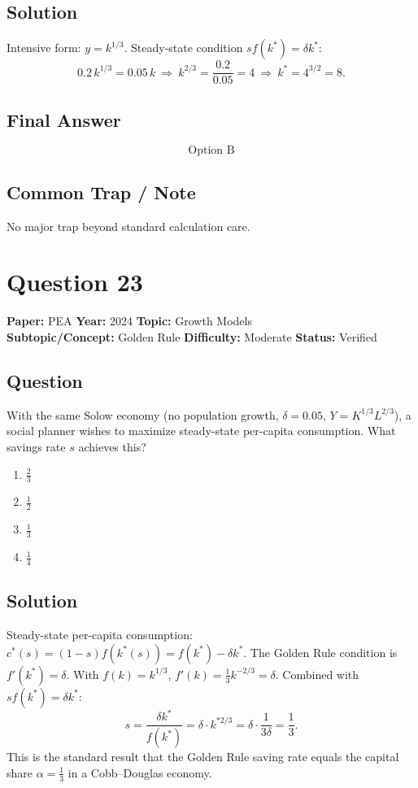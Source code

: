 \documentclass[11pt]{article}
\begin{document}
\subsection*{Solution}
Intensive form: $y=k^{1/3}$. Steady-state condition $sf(k^{*})=\delta k^{*}$:
\[
0.2\,k^{1/3}=0.05\,k\ \Longrightarrow\ k^{2/3}=\frac{0.2}{0.05}=4\ \Longrightarrow\ k^{*}=4^{3/2}=8.
\]

\subsection*{Final Answer}
\[
\boxed{\text{Option B}}
\]

\subsection*{Common Trap / Note}
No major trap beyond standard calculation care.

\section*{Question 23}
\textbf{Paper:} PEA \quad \textbf{Year:} 2024 \quad \textbf{Topic:} Growth Models \\
\textbf{Subtopic/Concept:} Golden Rule \quad \textbf{Difficulty:} Moderate \quad \textbf{Status:} Verified

\subsection*{Question}
With the same Solow economy (no population growth, $\delta=0.05$, $Y=K^{1/3}L^{2/3}$), a social planner wishes to maximize steady-state per-capita consumption. What savings rate $s$ achieves this?
\begin{enumerate}[label=(\Alph*)]
\item $\tfrac{2}{3}$
\item $\tfrac{1}{2}$
\item $\tfrac{1}{3}$
\item $\tfrac{1}{4}$
\end{enumerate}

\subsection*{Solution}
Steady-state per-capita consumption: $c^{*}(s)=(1-s)f(k^{*}(s))=f(k^{*})-\delta k^{*}$. The Golden Rule condition is $f'(k^{*})=\delta$. With $f(k)=k^{1/3}$, $f'(k)=\tfrac{1}{3}k^{-2/3}=\delta$. Combined with $sf(k^{*})=\delta k^{*}$:
\[
s = \frac{\delta k^{*}}{f(k^{*})}=\delta\cdot k^{*2/3}=\delta\cdot\frac{1}{3\delta}=\frac{1}{3}.
\]
This is the standard result that the Golden Rule saving rate equals the capital share $\alpha=\tfrac{1}{3}$ in a Cobb--Douglas economy.
\end{document}
